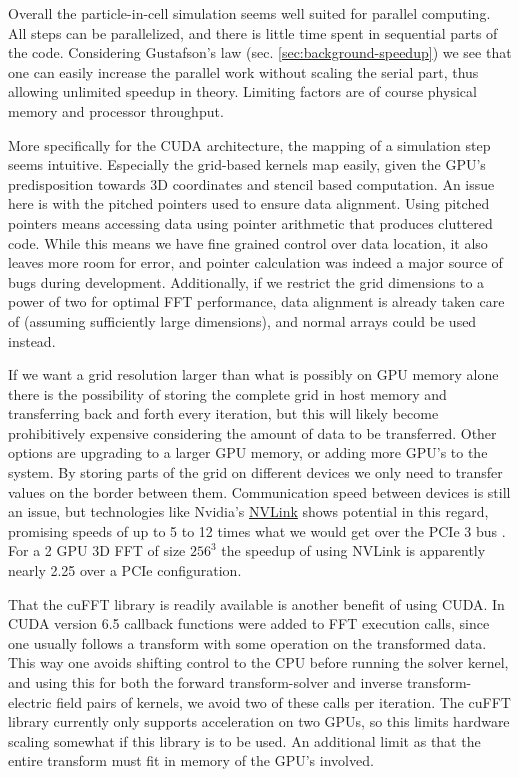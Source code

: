 Overall the particle-in-cell simulation seems well suited for parallel computing. All steps can be parallelized, and
there is little time spent in sequential parts of the code. Considering Gustafson's law (sec. \ref{sec:background-speedup})
we see that one can easily increase the parallel work without scaling the serial part, thus allowing unlimited speedup
in theory. Limiting factors are of course physical memory and processor throughput.

More specifically for the CUDA architecture, the mapping of a simulation step seems intuitive. Especially the grid-based
kernels map easily, given the GPU's predisposition towards 3D coordinates and stencil based computation. An issue here
is with the pitched pointers used to ensure data alignment. Using pitched pointers means accessing data using pointer
arithmetic that produces cluttered code. While this means we have fine grained control over data location, it also
leaves more room for error, and pointer calculation was indeed a major source of bugs during development. Additionally,
if we restrict the grid dimensions to a power of two for optimal FFT performance, data alignment is already taken care
of (assuming sufficiently large dimensions), and normal arrays could be used instead. 

If we want a grid resolution larger than what is possibly on GPU memory alone there is the possibility of storing the
complete grid in host memory and transferring back and forth every iteration, but this will likely become prohibitively
expensive considering the amount of data to be transferred. Other options are upgrading to a larger GPU memory, or
adding more GPU's to the system. By storing parts of the grid on different devices we only need to transfer values on the
border between them. Communication speed between devices is still an issue, but technologies like Nvidia's \href{http://www.nvidia.com/object/nvlink.html}{NVLink}
shows potential in this regard, promising speeds of up to 5 to 12 times what we would get over the PCIe 3 bus \cite{nvlink}.
For a 2 GPU 3D FFT of size $256^3$ the speedup of using NVLink is apparently nearly 2.25 over a PCIe configuration.

That the cuFFT library is readily available is another benefit of using CUDA. In CUDA version 6.5 callback functions
were added to FFT execution calls, since one usually follows a transform with some operation on the transformed data.
This way one avoids shifting control to the CPU before running the solver kernel, and using this for both the forward
transform-solver and inverse transform-electric field pairs of kernels, we avoid two of these calls per iteration.
The cuFFT library currently only supports acceleration on two GPUs, so this limits hardware scaling somewhat if this
library is to be used. An additional limit as that the entire transform must fit in memory of the GPU's involved\cite[sec.~2.8.4]{cufft-doc}.

